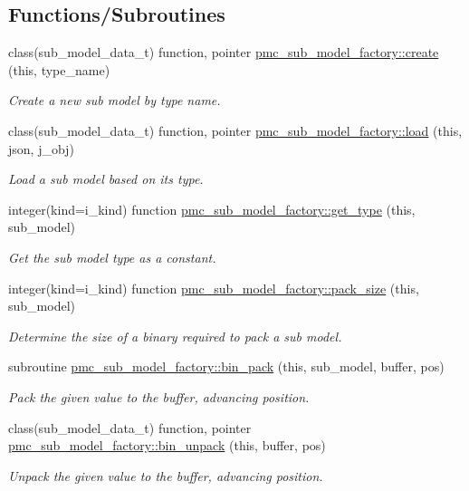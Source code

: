 \subsection*{Functions/\+Subroutines}
\begin{DoxyCompactItemize}
\item 
class(sub\+\_\+model\+\_\+data\+\_\+t) function, pointer \mbox{\hyperlink{namespacepmc__sub__model__factory_a599e3183a43b40a0483f597d3a8f3f9f}{pmc\+\_\+sub\+\_\+model\+\_\+factory\+::create}} (this, type\+\_\+name)
\begin{DoxyCompactList}\small\item\em Create a new sub model by type name. \end{DoxyCompactList}\item 
class(sub\+\_\+model\+\_\+data\+\_\+t) function, pointer \mbox{\hyperlink{namespacepmc__sub__model__factory_a21d3927bba83911130615002ee7a4843}{pmc\+\_\+sub\+\_\+model\+\_\+factory\+::load}} (this, json, j\+\_\+obj)
\begin{DoxyCompactList}\small\item\em Load a sub model based on its type. \end{DoxyCompactList}\item 
integer(kind=i\+\_\+kind) function \mbox{\hyperlink{namespacepmc__sub__model__factory_ad0a9ba95d8500fc520d015d1f54342f1}{pmc\+\_\+sub\+\_\+model\+\_\+factory\+::get\+\_\+type}} (this, sub\+\_\+model)
\begin{DoxyCompactList}\small\item\em Get the sub model type as a constant. \end{DoxyCompactList}\item 
integer(kind=i\+\_\+kind) function \mbox{\hyperlink{namespacepmc__sub__model__factory_a3678cad0d68a882ea264dc847eb1bd45}{pmc\+\_\+sub\+\_\+model\+\_\+factory\+::pack\+\_\+size}} (this, sub\+\_\+model)
\begin{DoxyCompactList}\small\item\em Determine the size of a binary required to pack a sub model. \end{DoxyCompactList}\item 
subroutine \mbox{\hyperlink{namespacepmc__sub__model__factory_ac14660d8917b4bf63e286d53535edc9d}{pmc\+\_\+sub\+\_\+model\+\_\+factory\+::bin\+\_\+pack}} (this, sub\+\_\+model, buffer, pos)
\begin{DoxyCompactList}\small\item\em Pack the given value to the buffer, advancing position. \end{DoxyCompactList}\item 
class(sub\+\_\+model\+\_\+data\+\_\+t) function, pointer \mbox{\hyperlink{namespacepmc__sub__model__factory_a0c4ac33aa5d78a5ad23805bacb8d7869}{pmc\+\_\+sub\+\_\+model\+\_\+factory\+::bin\+\_\+unpack}} (this, buffer, pos)
\begin{DoxyCompactList}\small\item\em Unpack the given value to the buffer, advancing position. \end{DoxyCompactList}\end{DoxyCompactItemize}
